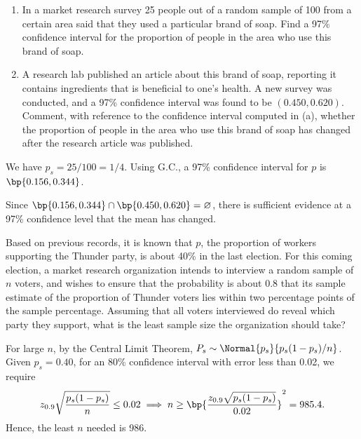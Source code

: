 \begin{problem}
    \begin{enumerate}
        \item In a market research survey 25 people out of a random sample of 100 from a certain area said that they used a particular brand of soap. Find a 97\% confidence interval for the proportion of people in the area who use this brand of soap.
        \item A research lab published an article about this brand of soap, reporting it contains ingredients that is beneficial to one's health. A new survey was conducted, and a 97\% confidence interval was found to be $(0.450, 0.620)$. Comment, with reference to the confidence interval computed in (a), whether the proportion of people in the area who use this brand of soap has changed after the research article was published.
    \end{enumerate}
\end{problem}
\begin{solution}
    \begin{ppart}
        We have $p_s = 25/100 = 1/4$. Using G.C., a 97\% confidence interval for $p$ is $\bp{0.156, 0.344}$.
    \end{ppart}
    \begin{ppart}
        Since $\bp{0.156, 0.344} \cap \bp{0.450, 0.620} = \varnothing$, there is sufficient evidence at a 97\% confidence level that the mean has changed.
    \end{ppart}
\end{solution}

\begin{problem}
    Based on previous records, it is known that $p$, the proportion of workers supporting the Thunder party, is about 40\% in the last election. For this coming election, a market research organization intends to interview a random sample of $n$ voters, and wishes to ensure that the probability is about $0.8$ that its sample estimate of the proportion of Thunder voters lies within two percentage points of the sample percentage. Assuming that all voters interviewed do reveal which party they support, what is the least sample size the organization should take?
\end{problem}
\begin{solution}
    For large $n$, by the Central Limit Theorem, $P_s \sim \Normal{p_s}{p_s (1-p_s) / n}$. Given $p_s = 0.40$, for an 80\% confidence interval with error less than 0.02, we require \[z_{0.9} \sqrt{\frac{p_s (1-p_s)}{n}} \leq 0.02 \implies n \geq \bp{\frac{z_{0.9} \sqrt{p_s (1 - p_s)}}{0.02}}^2 = 985.4.\] Hence, the least $n$ needed is 986.
\end{solution}